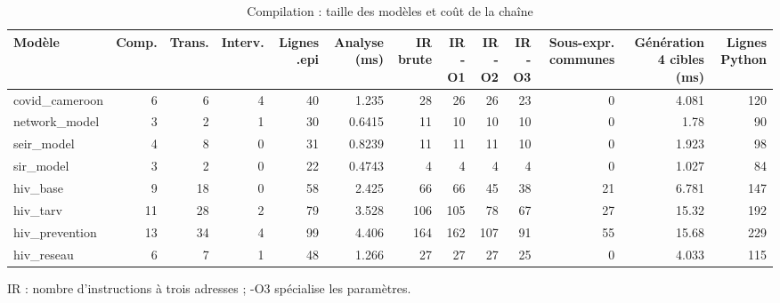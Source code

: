 

\begin{table}[htbp]
\centering
\small
\caption{Compilation : taille des modèles et coût de la chaîne}
\label{tab:bench-b1}
\begin{tabular}{lrrrrrrrrrrrr}
\toprule
Modèle & Comp. & Trans. & Interv. & Lignes .epi & Analyse (ms) & IR brute & IR -O1 & IR -O2 & IR -O3 & Sous-expr. communes & Génération 4 cibles (ms) & Lignes Python \\
\midrule
covid\_cameroon & 6 & 6 & 4 & 40 & 1.235 & 28 & 26 & 26 & 23 & 0 & 4.081 & 120 \\
network\_model & 3 & 2 & 1 & 30 & 0.6415 & 11 & 10 & 10 & 10 & 0 & 1.78 & 90 \\
seir\_model & 4 & 8 & 0 & 31 & 0.8239 & 11 & 11 & 11 & 10 & 0 & 1.923 & 98 \\
sir\_model & 3 & 2 & 0 & 22 & 0.4743 & 4 & 4 & 4 & 4 & 0 & 1.027 & 84 \\
hiv\_base & 9 & 18 & 0 & 58 & 2.425 & 66 & 66 & 45 & 38 & 21 & 6.781 & 147 \\
hiv\_tarv & 11 & 28 & 2 & 79 & 3.528 & 106 & 105 & 78 & 67 & 27 & 15.32 & 192 \\
hiv\_prevention & 13 & 34 & 4 & 99 & 4.406 & 164 & 162 & 107 & 91 & 55 & 15.68 & 229 \\
hiv\_reseau & 6 & 7 & 1 & 48 & 1.266 & 27 & 27 & 27 & 25 & 0 & 4.033 & 115 \\
\bottomrule
\end{tabular}
\par\smallskip\footnotesize IR : nombre d'instructions à trois adresses ; -O3 spécialise les paramètres.
\end{table}

